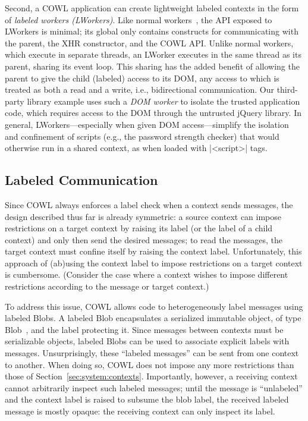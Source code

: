 Second, a COWL application can create lightweight labeled contexts in
the form of \emph{labeled workers (LWorkers)}.
%
Like normal workers~\cite{workers}, the API exposed to LWorkers is
minimal; its global only contains constructs for communicating
with the parent, the XHR constructor, and the COWL API.
%
Unlike normal workers, which execute in separate threads, an LWorker
executes in the same thread as its parent, sharing its event loop.
%
This sharing has the added benefit of allowing the parent to give the
child (labeled) access to its DOM, any access to which is treated as
both a read and a write, i.e., bidirectional communication.
%
Our third-party library example uses such a \emph{DOM worker} to
isolate the trusted application code, which requires access to the DOM
through the untrusted jQuery library.
%
In general, LWorkers---especially when given DOM access---simplify the
isolation and confinement of scripts (e.g., the password strength
checker) that would otherwise run in a shared context, as when loaded
with \js|<script>| tags.

\subsection{Labeled Communication}
\label{sec:system:communication}
Since COWL always enforces a label check when a context sends
messages, the design described thus far is already symmetric: a source
context can impose restrictions on a target context by raising its
label (or the label of a child context) and only then send the desired
messages; to read the messages, the target context must confine itself
by raising the context label.
%
Unfortunately, this approach of (ab)using the context label to impose
restrictions on a target context is cumbersome.
%
(Consider the case where a context wishes to impose different
restrictions according to the message or target context.)

To address this issue, COWL allows code to heterogeneously label
messages using labeled Blobs.
%
A labeled Blob encapsulates a serialized immutable object, of type
Blob~\cite{html5}, and the label protecting it.
%
Since messages between contexts must be serializable objects, labeled
Blobs can be used to associate explicit labels with messages.
%
Unsurprisingly, these ``labeled messages'' can be sent from one
context to another.
%
When doing so, COWL does not impose any more restrictions than those of
Section~\ref{sec:system:contexts}.
%
Importantly, however, a receiving context cannot arbitrarily inspect
such labeled messages;
%
until the message is ``unlabeled'' and the context label is raised to
subsume the blob label, the received labeled message is mostly opaque:
the receiving context can only inspect its label.

